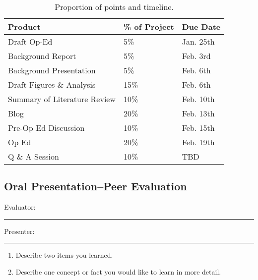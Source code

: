 \documentclass{article}\usepackage[]{graphicx}\usepackage[]{color}
\begin{document}
\begin{table}
\caption{Proportion of points and timeline.}
\begin{tabular}{lll}\hline
Product                     & \% of Project   & Due Date \\\hline\hline
Draft Op-Ed                 & 5\%             & Jan. 25th \\
Background Report           & 5\%             & Feb. 3rd \\
Background Presentation     & 5\%             & Feb. 6th \\
Draft Figures \& Analysis   & 15\%            & Feb. 6th \\
Summary of Literature Review& 10\%            & Feb. 10th \\
Blog                        & 20\%            & Feb. 13th \\
Pre-Op Ed Discussion        & 10\%            & Feb. 15th \\     
Op Ed                       & 20\%            & Feb. 19th \\
Q \& A Session              & 10\%            & TBD \\ \hline

\end{tabular}
\end{table}

\clearpage
\newpage
\subsection{Oral Presentation--Peer Evaluation}

\bigskip
Evaluator: \rule{7cm}{0.4pt}

\bigskip

\noindent Presenter: \rule{7cm}{0.4pt}

\begin{enumerate}
 \setlength\itemsep{4em}
  \item Describe two items you learned.
  \item Describe one concept or fact you would like to learn in more detail.
\end{enumerate}
\end{document}
